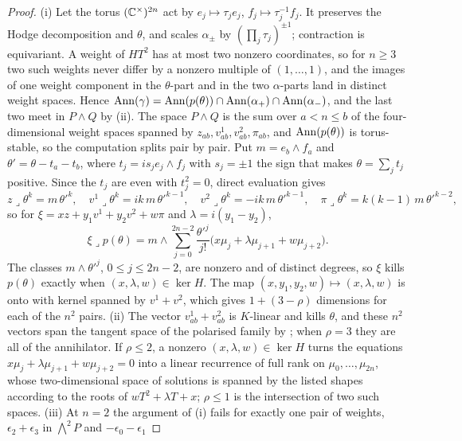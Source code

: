 \begin{proof}
(i) Let the torus $(\mathbb{C}^{\times})^{2n}$ act by $e_{j}\mapsto\tau_{j}e_{j}$,
$f_{j}\mapsto\tau_{j}^{-1}f_{j}$. It preserves the Hodge decomposition and
$\theta$, and scales $\alpha_{\pm}$ by $(\prod_{j}\tau_{j})^{\pm1}$;
contraction is equivariant. A weight of $HT^{2}$ has at most two nonzero
coordinates, so for $n\ge3$ two such weights never differ by a nonzero
multiple of $(1,\dots,1)$, and the images of one weight component in the
$\theta$-part and in the two $\alpha$-parts land in distinct weight spaces.
Hence $\operatorname{Ann}(\gamma)=\operatorname{Ann}(p(\theta))\cap\operatorname{Ann}(\alpha_{+})\cap\operatorname{Ann}(\alpha_{-})$,
and the last two meet in $P\wedge Q$ by (ii). The space
$P\wedge Q$ is the sum over $a<n\le b$ of the four-dimensional weight spaces
spanned by $z_{ab},v^{1}_{ab},v^{2}_{ab},\pi_{ab}$, and $\operatorname{Ann}(p(\theta))$ is
torus-stable, so the computation splits pair by pair. Put
$m=e_{b}\wedge f_{a}$ and $\theta'=\theta-t_{a}-t_{b}$, where
$t_{j}=i s_{j}e_{j}\wedge f_{j}$ with $s_{j}=\pm1$ the sign that makes
$\theta=\sum_{j}t_{j}$ positive. Since the $t_{j}$ are even with
$t_{j}^{2}=0$, direct evaluation gives
\[
  z\lrcorner\theta^{k}=m\,\theta'^{k},\quad
  v^{1}\lrcorner\theta^{k}=ik\,m\,\theta'^{k-1},\quad
  v^{2}\lrcorner\theta^{k}=-ik\,m\,\theta'^{k-1},\quad
  \pi\lrcorner\theta^{k}=k(k-1)\,m\,\theta'^{k-2},
\]
so for $\xi=xz+y_{1}v^{1}+y_{2}v^{2}+w\pi$ and $\lambda=i(y_{1}-y_{2})$,
\[
  \xi\lrcorner p(\theta)=m\wedge\sum_{j=0}^{2n-2}\frac{\theta'^{j}}{j!}
  \bigl(x\mu_{j}+\lambda\mu_{j+1}+w\mu_{j+2}\bigr).
\]
The classes $m\wedge\theta'^{j}$, $0\le j\le2n-2$, are nonzero and of distinct
degrees, so $\xi$ kills $p(\theta)$ exactly when $(x,\lambda,w)\in\ker H$.
The map $(x,y_{1},y_{2},w)\mapsto(x,\lambda,w)$ is onto with kernel spanned by
$v^{1}+v^{2}$, which gives $1+(3-\rho)$ dimensions for each of the $n^{2}$
pairs. (ii) The vector $v^{1}_{ab}+v^{2}_{ab}$ is $K$-linear and kills
$\theta$, and these $n^{2}$ vectors span the tangent space of the polarised
family by ; when $\rho=3$ they are all of the
annihilator. If $\rho\le2$, a nonzero $(x,\lambda,w)\in\ker H$ turns the
equations $x\mu_{j}+\lambda\mu_{j+1}+w\mu_{j+2}=0$ into a linear recurrence of
full rank on $\mu_{0},\dots,\mu_{2n}$, whose two-dimensional space of
solutions is spanned by the listed shapes according to the roots of
$wT^{2}+\lambda T+x$; $\rho\le1$ is the intersection of two such spaces.
(iii) At $n=2$ the argument of (i) fails for exactly one pair of weights,
$\epsilon_{2}+\epsilon_{3}$ in $\bigwedge^{2}P$ and $-\epsilon_{0}-\epsilon_{1}$

\end{proof}
